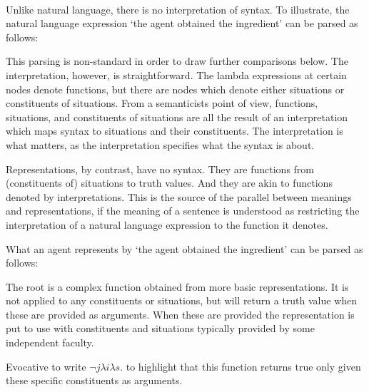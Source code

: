 \documentclass[10pt]{article}
\begin{document}
\newpage

\mbox{ }

\newpage


Unlike natural language, there is no interpretation of syntax.
To illustrate, the natural language expression `the agent obtained the ingredient' can be parsed as follows:









This parsing is non-standard in order to draw further comparisons below.
The interpretation, however, is straightforward.
The lambda expressions at certain nodes denote functions, but there are nodes which denote either situations or constituents of situations.
From a semanticists point of view, functions, situations, and constituents of situations are all the result of an interpretation which maps syntax to situations and their constituents.
The interpretation is what matters, as the interpretation specifies what the syntax is about.

Representations, by contrast, have no syntax.
They are functions from (constituents of) situations to truth values.
And they are akin to functions denoted by interpretations.
This is the source of the parallel between meanings and representations, if the meaning of a sentence is understood as restricting the interpretation of a natural language expression to the function it denotes.

What an agent represents by `the agent obtained the ingredient' can be parsed as follows:


The root is a complex function obtained from more basic representations.
It is not applied to any constituents or situations, but will return a truth value when these are provided as arguments.
When these are provided the representation is put to use with constituents and situations typically provided by some independent faculty.


Evocative to write \(\lnot j \lambda i\lambda s.\) to highlight that this function returns true only given these specific constituents as arguments.
\end{document}
